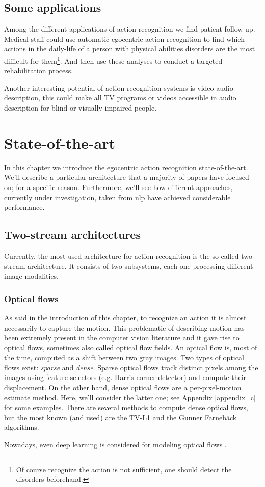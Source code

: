 \documentclass[12pt, a4paper]{report}
\begin{document}
				\subsection*{Some applications}
					Among the different applications of action recognition we find patient follow-up.
					Medical staff could use automatic egocentric action recognition to find which actions in the daily-life of a person with physical abilities disorders are the most difficult for them\footnote{Of course recognize the action is not sufficient, one should detect the disorders beforehand.}.
					And then use these analyses to conduct a targeted rehabilitation process.
					\par
					Another interesting potential of action recognition systems is video audio description, this could make all TV programs or videos accessible in audio description for blind or visually impaired people.
		\section{State-of-the-art}
			In this chapter we introduce the egocentric action recognition state-of-the-art.
			We'll describe a particular architecture that a majority of papers have focused on; for a specific reason.
			Furthermore, we'll see how different approaches, currently under investigation, taken from \gls{nlp} have achieved considerable performance.
			\subsection{Two-stream architectures}\label{twostream}
				Currently, the most used architecture for action recognition is the so-called two-stream architecture.
				It consists of two subsystems, each one processing different image modalities.
				\subsubsection{Optical flows}
					As said in the introduction of this chapter, to recognize an action it is almost necessarily to capture the motion.
					This problematic of describing motion has been extremely present in the computer vision literature and it gave rise to optical flows, sometimes also called optical flow fields.
					An optical flow is, most of the time, computed as a shift between two gray images.
					Two types of optical flows exist: {\itshape sparse} and {\itshape dense}.
					Sparse optical flows track distinct pixels among the images using feature selectors (e.g. Harris corner detector) and compute their displacement.
					On the other hand, dense optical flows are a per-pixel-motion estimate method.
					Here, we'll consider the latter one; see Appendix \ref{appendix_c} for some examples.
					There are several methods to compute dense optical flows, but the most known (and used) are the TV-L1 \cite{perez2013tv} and the Gunner Farnebäck \cite{farneback2003two} algorithms.
					\par
					Nowadays, even deep learning is considered for modeling optical flows \cite{hur2020optical}.
\end{document}
